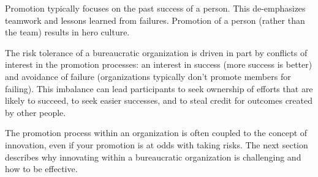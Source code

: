 Promotion typically focuses on the past success of a person. This de-emphasizes teamwork and lessons learned from failures. 
Promotion of a person (rather than the team) results in hero culture.


The risk tolerance of a bureaucratic organization is driven in part by conflicts of interest in the promotion processes: an interest in success (more success is better) and avoidance of failure (organizations typically don't promote members for failing). This imbalance can lead participants to seek ownership of efforts that are likely to succeed, to seek easier successes, and to steal credit for outcomes created by other people. 


The promotion process within an organization is often coupled to the concept of innovation, even if your promotion is at odds with taking risks. The next section describes why innovating within a bureaucratic organization is challenging and how to be effective.

